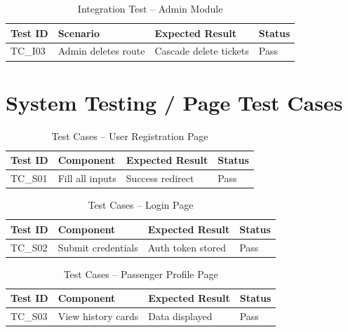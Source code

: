 \begin{table}[H]
\centering
\begin{tabular}{|p{1.5cm}|p{5cm}|p{4cm}|p{4cm}|}
\hline \textbf{Test ID} & \textbf{Scenario} & \textbf{Expected Result} & \textbf{Status} \\ \hline
TC\_I03 & Admin deletes route & Cascade delete tickets & Pass \\ \hline
\end{tabular}
\caption{Integration Test – Admin Module}
\end{table}

\section{System Testing / Page Test Cases}

\begin{table}[H]
\centering
\begin{tabular}{|p{1.5cm}|p{5cm}|p{4cm}|p{4cm}|}
\hline \textbf{Test ID} & \textbf{Component} & \textbf{Expected Result} & \textbf{Status} \\ \hline
TC\_S01 & Fill all inputs & Success redirect & Pass \\ \hline
\end{tabular}
\caption{Test Cases – User Registration Page}
\end{table}

\begin{table}[H]
\centering
\begin{tabular}{|p{1.5cm}|p{5cm}|p{4cm}|p{4cm}|}
\hline \textbf{Test ID} & \textbf{Component} & \textbf{Expected Result} & \textbf{Status} \\ \hline
TC\_S02 & Submit credentials & Auth token stored & Pass \\ \hline
\end{tabular}
\caption{Test Cases – Login Page}
\end{table}

\begin{table}[H]
\centering
\begin{tabular}{|p{1.5cm}|p{5cm}|p{4cm}|p{4cm}|}
\hline \textbf{Test ID} & \textbf{Component} & \textbf{Expected Result} & \textbf{Status} \\ \hline
TC\_S03 & View history cards & Data displayed & Pass \\ \hline
\end{tabular}
\caption{Test Cases – Passenger Profile Page}
\end{table}

